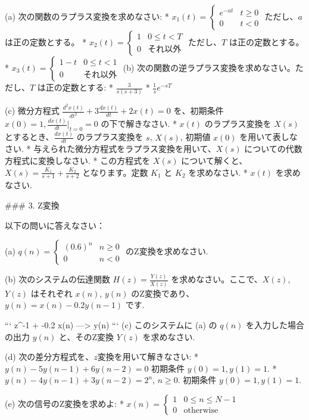 \documentclass{ltjsarticle}
\begin{document}
(a) 次の関数のラプラス変換を求めなさい:
    *   $x_1(t) = \begin{cases} e^{-at} & t \ge 0 \\ 0 & t < 0 \end{cases}$  ただし、$a$ は正の定数とする。
    *   $x_2(t) = \begin{cases} 1 & 0 \le t < T \\ 0 & \text{それ以外} \end{cases}$ ただし、$T$ は正の定数とする。
    *  $x_3(t) = \begin{cases} 1-t & 0 \le t < 1 \\ 0 & \text{それ以外} \end{cases}$
(b) 次の関数の逆ラプラス変換を求めなさい。ただし、$T$ は正の定数とする:
    *  $\frac{3}{s(s+3)}$
    *   $\frac{1}{s}e^{-sT}$

(c) 微分方程式 $\frac{d^2x(t)}{dt^2} + 3\frac{dx(t)}{dt} + 2x(t) = 0$ を、初期条件 $x(0) = 1, \frac{dx(t)}{dt}|_{t=0} = 0$ の下で解きなさい.
   *   $x(t)$ のラプラス変換を $X(s)$ とするとき、$\frac{dx(t)}{dt}$ のラプラス変換を $s$, $X(s)$, 初期値 $x(0)$ を用いて表しなさい.
   *   与えられた微分方程式をラプラス変換を用いて、$X(s)$ についての代数方程式に変換しなさい.
   *   この方程式を $X(s)$ について解くと、$X(s) = \frac{K_1}{s+1} + \frac{K_2}{s+2}$ となります。定数 $K_1$ と $K_2$ を求めなさい.
   *   $x(t)$ を求めなさい.

### 3. Z変換

以下の問いに答えなさい：

(a) $q(n) = \begin{cases} (0.6)^n & n \ge 0 \\ 0 & n < 0 \end{cases}$ のZ変換を求めなさい.

(b) 次のシステムの伝達関数 $H(z) = \frac{Y(z)}{X(z)}$ を求めなさい。ここで、$X(z)$, $Y(z)$ はそれぞれ $x(n)$, $y(n)$ のZ変換であり、$y(n) = x(n) - 0.2y(n-1)$ です.
    
    ```
    z^-1
    +
    -0.2
    x(n) ---> y(n)
    ```
(c) このシステムに (a) の $q(n)$ を入力した場合の出力 $y(n)$ と、そのZ変換 $Y(z)$ を求めなさい.

(d) 次の差分方程式を、$z$変換を用いて解きなさい:
    *   $y(n) - 5y(n-1) + 6y(n-2) = 0$ 初期条件 $y(0) = 1, y(1) = 1$.
    *   $y(n) - 4y(n-1) + 3y(n-2) = 2^n$, $n \ge 0$. 初期条件 $y(0) = 1, y(1) = 1$.

(e) 次の信号のZ変換を求めよ:
    *  $x(n) = \begin{cases} 1 & 0 \le n \le N-1 \\ 0 & \text{otherwise} \end{cases}$
\end{document}
